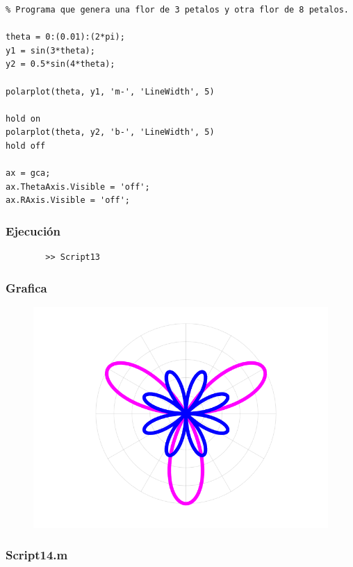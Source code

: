 \documentclass{article}
\begin{document}
	\begin{lstlisting}
% Programa que genera una flor de 3 petalos y otra flor de 8 petalos.

theta = 0:(0.01):(2*pi);
y1 = sin(3*theta);
y2 = 0.5*sin(4*theta);

polarplot(theta, y1, 'm-', 'LineWidth', 5)

hold on
polarplot(theta, y2, 'b-', 'LineWidth', 5)
hold off

ax = gca;
ax.ThetaAxis.Visible = 'off';
ax.RAxis.Visible = 'off';
	\end{lstlisting}
	
	\subsubsection{Ejecución}
	
	\begin{lstlisting}
		>> Script13
	\end{lstlisting}
	
	\subsubsection{Grafica}
	
	\begin{figure}[h]
		\centering
		\includegraphics[width=\textwidth]{grafica13.png}
	\end{figure}
	
	\subsubsection{Script14.m}
	
\end{document}
